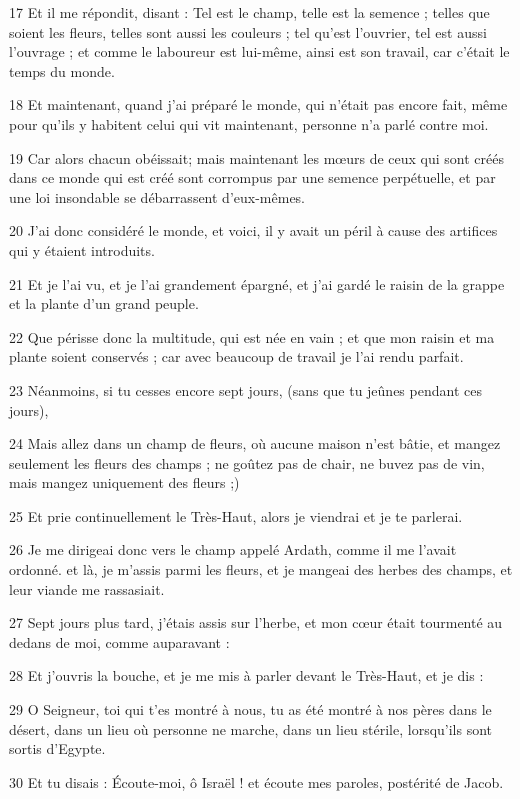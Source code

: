 \par 17 Et il me répondit, disant : Tel est le champ, telle est la semence ; telles que soient les fleurs, telles sont aussi les couleurs ; tel qu'est l'ouvrier, tel est aussi l'ouvrage ; et comme le laboureur est lui-même, ainsi est son travail, car c'était le temps du monde.
\par 18 Et maintenant, quand j'ai préparé le monde, qui n'était pas encore fait, même pour qu'ils y habitent celui qui vit maintenant, personne n'a parlé contre moi.
\par 19 Car alors chacun obéissait; mais maintenant les mœurs de ceux qui sont créés dans ce monde qui est créé sont corrompus par une semence perpétuelle, et par une loi insondable se débarrassent d'eux-mêmes.
\par 20 J'ai donc considéré le monde, et voici, il y avait un péril à cause des artifices qui y étaient introduits.
\par 21 Et je l'ai vu, et je l'ai grandement épargné, et j'ai gardé le raisin de la grappe et la plante d'un grand peuple.
\par 22 Que périsse donc la multitude, qui est née en vain ; et que mon raisin et ma plante soient conservés ; car avec beaucoup de travail je l'ai rendu parfait.
\par 23 Néanmoins, si tu cesses encore sept jours, (sans que tu jeûnes pendant ces jours),
\par 24 Mais allez dans un champ de fleurs, où aucune maison n'est bâtie, et mangez seulement les fleurs des champs ; ne goûtez pas de chair, ne buvez pas de vin, mais mangez uniquement des fleurs ;)
\par 25 Et prie continuellement le Très-Haut, alors je viendrai et je te parlerai.
\par 26 Je me dirigeai donc vers le champ appelé Ardath, comme il me l'avait ordonné. et là, je m'assis parmi les fleurs, et je mangeai des herbes des champs, et leur viande me rassasiait.
\par 27 Sept jours plus tard, j'étais assis sur l'herbe, et mon cœur était tourmenté au dedans de moi, comme auparavant :
\par 28 Et j'ouvris la bouche, et je me mis à parler devant le Très-Haut, et je dis :
\par 29 O Seigneur, toi qui t'es montré à nous, tu as été montré à nos pères dans le désert, dans un lieu où personne ne marche, dans un lieu stérile, lorsqu'ils sont sortis d'Egypte.
\par 30 Et tu disais : Écoute-moi, ô Israël ! et écoute mes paroles, postérité de Jacob.
